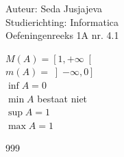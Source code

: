 \documentclass[a4paper]{article}
\begin{document}
\noindent \large Auteur: Seda Jusjajeva\\
\noindent \large Studierichting: Informatica\\
\noindent \large Oefeningenreeks 1A nr. 4.1\\

\medskip

\normalsize

$M(A) = \left[ 1, +\infty \right[$\\

$m(A) = \left]-\infty, 0 \right]$\\

$\inf A = 0$\\

$\min A $ bestaat niet\\

$\sup A = 1$\\

$\max A = 1$\\



\begin{thebibliography}{999}
\end{thebibliography}
\end{document}

